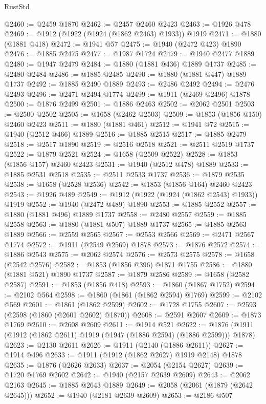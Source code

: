 \begin{lexlean}{RustStd}
\begin{coremodule}
@2460 := @2459 @1870
@2462 := @2457 @2460 @2423
@2463 := @1926 @478
@2469 := @1912 (@1922 (@1924 (@1862 @2463) @1933)) @1919
@2471 := @1880 (@1881 @418)
@2472 := @1941 @57
@2475 := @1940 (@2472 @423) @1890
@2476 := @1885 @2475
@2477 := @1987 @1724
@2479 := @1940 @2477 @1889
@2480 := @1947 @2479
@2484 := @1880 (@1881 @436) @1889 @1737
@2485 := @2480 @2484
@2486 := @1885 @2485
@2490 := @1880 (@1881 @447) @1889 @1737
@2492 := @1885 @2490 @1889
@2493 := @2486 @2492
@2494 := @2476 @2493
@2496 := @2471 @2494 @1774
@2499 := @1911 (@2469 @2496) @1878
@2500 := @1876 @2499
@2501 := @1886 @2463
@2502 := @2062 @2501
@2503 := @2500 @2502
@2505 := @1658 (@2462 @2503)
@2509 := @1853 (@1856 @150) @2460 @2423
@2511 := @1880 (@1881 @461)
@2512 := @1941 @72
@2515 := @1940 (@2512 @466) @1889
@2516 := @1885 @2515
@2517 := @1885 @2479
@2518 := @2517 @1890
@2519 := @2516 @2518
@2521 := @2511 @2519 @1737
@2522 := @1879 @2521
@2524 := @1658 (@2509 @2522)
@2528 := @1853 (@1856 @157) @2460 @2423
@2531 := @1940 (@2512 @478) @1889
@2533 := @1885 @2531 @2518
@2535 := @2511 @2533 @1737
@2536 := @1879 @2535
@2538 := @1658 (@2528 @2536)
@2542 := @1853 (@1856 @164) @2460 @2423
@2543 := @1926 @489
@2549 := @1912 (@1922 (@1924 (@1862 @2543) @1933)) @1919
@2552 := @1940 (@2472 @489) @1890
@2553 := @1885 @2552
@2557 := @1880 (@1881 @496) @1889 @1737
@2558 := @2480 @2557
@2559 := @1885 @2558
@2563 := @1880 (@1881 @507) @1889 @1737
@2565 := @1885 @2563 @1889
@2566 := @2559 @2565
@2567 := @2553 @2566
@2569 := @2471 @2567 @1774
@2572 := @1911 (@2549 @2569) @1878
@2573 := @1876 @2572
@2574 := @1886 @2543
@2575 := @2062 @2574
@2576 := @2573 @2575
@2578 := @1658 (@2542 @2576)
@2582 := @1853 (@1856 @396) @1871 @1755
@2586 := @1880 (@1881 @521) @1890 @1737
@2587 := @1879 @2586
@2589 := @1658 (@2582 @2587)
@2591 := @1853 (@1856 @418)
@2593 := @1860 (@1867 @1752)
@2594 := @2102 @564
@2598 := @1860 (@1861 (@1862 @2594) @1769)
@2599 := @2102 @569
@2601 := @1861 (@1862 @2599)
@2602 := @1728 @1755
@2607 := @2593 (@2598 (@1860 (@2601 @2602) @1870))
@2608 := @2591 @2607
@2609 := @1873 @1769
@2610 := @2608 @2609
@2611 := @1914 @521
@2622 := @1876 (@1911 (@1912 (@1862 @2611) @1919 (@1947 (@1886 @2594) (@1886 @2599))) @1878)
@2623 := @2130 @2611
@2626 := @1911 (@2140 (@1886 @2611))
@2627 := @1914 @496
@2633 := @1911 (@1912 (@1862 @2627) @1919 @2148) @1878
@2635 := @1876 (@2626 @2633)
@2637 := @2054 (@2154 @2627)
@2639 := @1720 @1769 @2602
@2642 := @1940 (@2157 @2639 @2609)
@2643 := @2062 @2163
@2645 := @1885 @2643 @1889
@2649 := @2058 (@2061 (@1879 (@2642 @2645)))
@2652 := @1940 (@2181 @2639 @2609)
@2653 := @2186 @507

\end{coremodule}
\end{lexlean}
